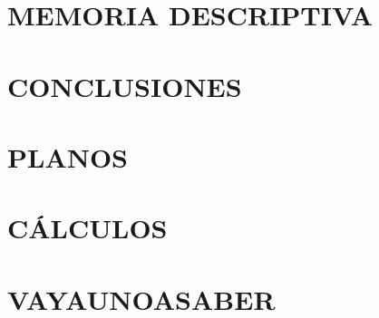 \documentclass[12pt,a4paper,oneside]{report}
\begin{document}
	\chapter{MEMORIA DESCRIPTIVA}
	
	
	
	\chapter{CONCLUSIONES}
	
	
	
	\setupname[ANEXO]
	
	 \appendix
	 \renewcommand{\thechapter}{\arabic{chapter}}
	 \setcounter{section}{0}
	 \chapter{PLANOS}
	 
	 \chapter{CÁLCULOS}
	 
	 \chapter{VAYAUNOASABER}
	 

	
\end{document}

